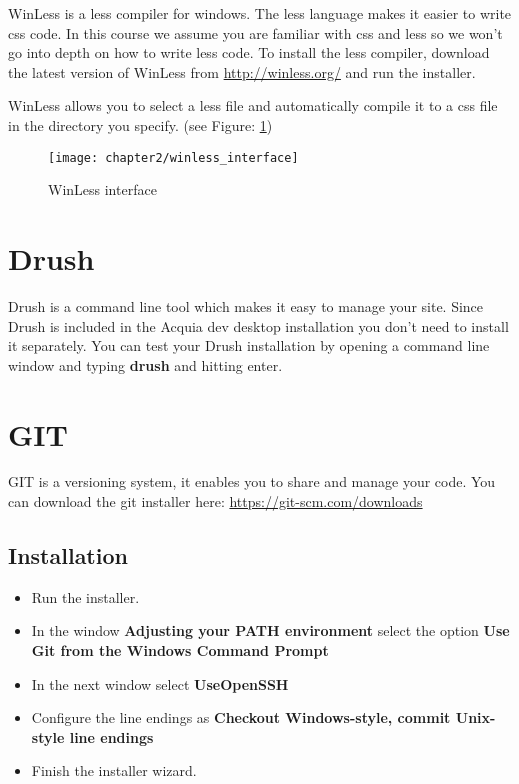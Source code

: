 WinLess is a less compiler for windows. The less language makes it easier to write css code. In this course we assume you are familiar with css and less so we won't go into depth on how to write less code. To install the less compiler, download the latest version of WinLess from \url{http://winless.org/} and run the installer. 

WinLess allows you to select a less file and automatically compile it to a css file in the directory you specify. (see Figure: \ref{fig:winless_interface})

	\begin{figure}[H]
		\centering
		\texttt{[image: chapter2/winless\_interface]}
		\caption{WinLess interface}
		\label{fig:winless_interface}
	\end{figure}
	
\section{Drush}

Drush is a command line tool which makes it easy to manage your site. Since Drush is included in the Acquia dev desktop installation you don't need to install it separately. You can test your Drush installation by opening a command line window and typing \textbf{drush} and hitting enter.

\section{GIT} 

GIT is a versioning system, it enables you to share and manage your code. You can download the git installer here: \url{https://git-scm.com/downloads}

\subsection{Installation}

\begin{itemize}
	\item Run the installer. 
	\item In the window \textbf{Adjusting your PATH environment} select the option \textbf{Use Git from the Windows Command Prompt}
	\item In the next window select \textbf{UseOpenSSH}
	\item Configure the line endings as \textbf{Checkout Windows-style, commit Unix-style line endings}
	\item Finish the installer wizard.
\end{itemize}
 
